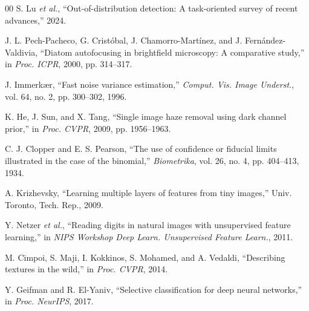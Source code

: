 \documentclass[conference]{IEEEtran}
\begin{document}
\begin{thebibliography}{00}
 S. Lu \textit{et al.}, ``Out-of-distribution detection: A task-oriented survey of recent advances,'' 2024.

 J. L. Pech-Pacheco, G. Crist\'{o}bal, J. Chamorro-Mart\'{i}nez, and J. Fern\'{a}ndez-Valdivia, ``Diatom autofocusing in brightfield microscopy: A comparative study,'' in \textit{Proc. ICPR}, 2000, pp. 314--317.

 J. Immerk\ae r, ``Fast noise variance estimation,'' \textit{Comput. Vis. Image Underst.}, vol. 64, no. 2, pp. 300--302, 1996.

 K. He, J. Sun, and X. Tang, ``Single image haze removal using dark channel prior,'' in \textit{Proc. CVPR}, 2009, pp. 1956--1963.

 C. J. Clopper and E. S. Pearson, ``The use of confidence or fiducial limits illustrated in the case of the binomial,'' \textit{Biometrika}, vol. 26, no. 4, pp. 404--413, 1934.

 A. Krizhevsky, ``Learning multiple layers of features from tiny images,'' Univ. Toronto, Tech. Rep., 2009.

 Y. Netzer \textit{et al.}, ``Reading digits in natural images with unsupervised feature learning,'' in \textit{NIPS Workshop Deep Learn. Unsupervised Feature Learn.}, 2011.

 M. Cimpoi, S. Maji, I. Kokkinos, S. Mohamed, and A. Vedaldi, ``Describing textures in the wild,'' in \textit{Proc. CVPR}, 2014.

 Y. Geifman and R. El-Yaniv, ``Selective classification for deep neural networks,'' in \textit{Proc. NeurIPS}, 2017.

\end{thebibliography}
\end{document}
